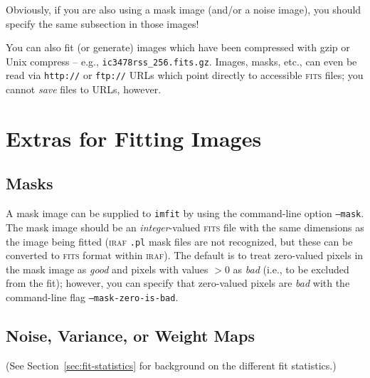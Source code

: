 \documentclass[10pt,a4paper,article]{memoir}
\newcommand{\imfit}{\texttt{imfit}}
\begin{document}
Obviously, if you are also using a mask image (and/or a noise image), you should
specify the same subsection in those images!

You can also fit (or generate) images which have been compressed with gzip or
Unix compress -- e.g., \texttt{ic3478rss\_256.fits.gz}.
Images, masks, etc., can even be read via \texttt{http://} or \texttt{ftp://} URLs which point directly to
accessible \textsc{fits} files; you
cannot \textit{save} files to URLs, however.



\chapter{Extras for Fitting Images}

\section{Masks}

A mask image can be supplied to \imfit{} by using the command-line
option \texttt{--mask}. The mask image should be an \textit{integer}-valued
\textsc{fits} file with the same dimensions as the image being fitted (\textsc{iraf} \texttt{.pl}
mask files are not recognized, but these can be converted to \textsc{fits} format within
\textsc{iraf}). The default is to treat zero-valued pixels in the mask image as
\textit{good} and pixels with values $> 0$ as \textit{bad} (i.e., to be excluded
from the fit); however, you can specify that zero-valued pixels are \textit{bad}
with the command-line flag \texttt{--mask-zero-is-bad}.



\section{Noise, Variance, or Weight Maps}\label{sec:noise-maps}

(See Section~\ref{sec:fit-statistics} for background on the different fit statistics.)
\end{document}
